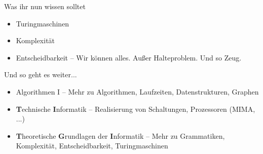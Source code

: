 \def\abbrsize{\footnotesize}
\begin{frame}	
	\begin{block}{Was ihr nun wissen solltet}
		\begin{itemize}
			\item Turingmaschinen
			\item Komplexität
			\item Entscheidbarkeit -- Wir können alles. Außer Halteproblem. Und so Zeug.
		\end{itemize}
	\end{block}
	
	\begin{block}{Und so geht es weiter...}
		\vspace{-.3\baselineskip}
		\begin{itemize}
			\item Algorithmen I -- Mehr zu Algorithmen, Laufzeiten, Datenstrukturen, Graphen
			\item \textbf{T}{\abbrsize echnische} \textbf{I}{\abbrsize nformatik} -- Realisierung von Schaltungen, Prozessoren (MIMA, ...)
			\item \textbf{T}{\abbrsize heoretische} \textbf{G}{\abbrsize rundlagen der} \textbf{I}{\abbrsize nformatik} -- Mehr zu Grammatiken, Komplexität, Entscheidbarkeit, Turingmaschinen
		\end{itemize}
	\end{block}
\end{frame}



